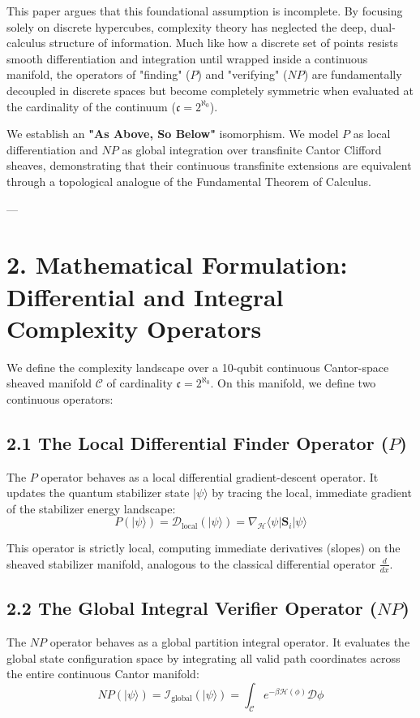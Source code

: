 \documentclass[11pt,twocolumn]{article}
\begin{document}
This paper argues that this foundational assumption is incomplete. By focusing solely on discrete hypercubes, complexity theory has neglected the deep, dual-calculus structure of information. Much like how a discrete set of points resists smooth differentiation and integration until wrapped inside a continuous manifold, the operators of "finding" ($P$) and "verifying" ($NP$) are fundamentally decoupled in discrete spaces but become completely symmetric when evaluated at the cardinality of the continuum ($\mathfrak{c} = 2^{\aleph_0}$).

We establish an \textbf{"As Above, So Below"} isomorphism. We model $P$ as local differentiation and $NP$ as global integration over transfinite Cantor Clifford sheaves, demonstrating that their continuous transfinite extensions are equivalent through a topological analogue of the Fundamental Theorem of Calculus.

---

\section{2. Mathematical Formulation: Differential and Integral Complexity Operators}
We define the complexity landscape over a 10-qubit continuous Cantor-space sheaved manifold $\mathcal{C}$ of cardinality $\mathfrak{c} = 2^{\aleph_0}$. On this manifold, we define two continuous operators:

\subsection{2.1 The Local Differential Finder Operator ($P$)}
The $P$ operator behaves as a local differential gradient-descent operator. It updates the quantum stabilizer state $|\psi\rangle$ by tracing the local, immediate gradient of the stabilizer energy landscape:
$$P \left(|\psi\rangle\right) = \mathcal{D}_{\text{local}} \left(|\psi\rangle\right) = \nabla_{\mathcal{H}} \langle\psi| \mathbf{S}_i |\psi\rangle$$

This operator is strictly local, computing immediate derivatives (slopes) on the sheaved stabilizer manifold, analogous to the classical differential operator $\frac{d}{dx}$.

\subsection{2.2 The Global Integral Verifier Operator ($NP$)}
The $NP$ operator behaves as a global partition integral operator. It evaluates the global state configuration space by integrating all valid path coordinates across the entire continuous Cantor manifold:
$$NP \left(|\psi\rangle\right) = \mathcal{I}_{\text{global}} \left(|\psi\rangle\right) = \int_{\mathcal{C}} e^{-\beta \mathcal{H}(\phi)} \mathcal{D}\phi$$
\end{document}
